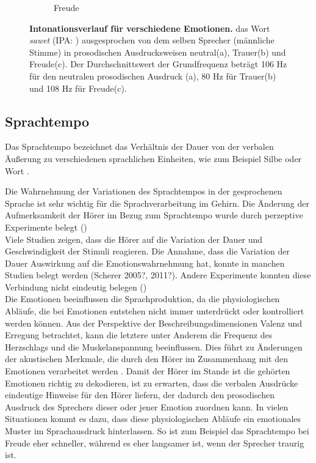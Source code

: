 \documentclass[11pt,a4paper,headsepline,twoside,toc=bibliography]{scrreprt}
\begin{document}
\begin{figure}
\begin{subfigure}{0.8\textwidth}
		\caption{Freude}
		\label{fig:sawet_F}
	\end{subfigure}
	\caption{\textbf{Intonationsverlauf für verschiedene Emotionen.} das Wort \emph{sawet} (IPA: ) ausgesprochen von dem selben Sprecher (männliche Stimme) in prosodischen Ausdrucksweisen  neutral(a), Trauer(b) und Freude(c). Der Durchschnittswert der Grundfrequenz beträgt 106 Hz für den neutralen prosodischen Ausdruck (a), 80 Hz für Trauer(b) und 108 Hz für Freude(c).}
	\label{fig:pitch_variation}
\end{figure}


\subsection{Sprachtempo}

Das Sprachtempo bezeichnet das Verhältnis der Dauer von der verbalen Äußerung zu verschiedenen sprachlichen Einheiten, wie zum Beispiel Silbe oder Wort \autocite{Ackermann2004}.  

Die Wahrnehmung der Variationen des Sprachtempos in der gesprochenen Sprache ist sehr wichtig für die Sprachverarbeitung im Gehirn. Die Änderung der Aufmerksamkeit der Hörer im Bezug zum Sprachtempo wurde durch perzeptive Experimente belegt () \\ 
 

 
Viele Studien zeigen, dass die Hörer auf die Variation der Dauer und Geschwindigkeit der Stimuli reagieren. Die Annahme, dass die Variation der Dauer Auswirkung auf die Emotionswahrnehmung hat, konnte in manchen Studien belegt werden (Scherer 2005?, 2011?). Andere Experimente konnten diese Verbindung nicht eindeutig belegen (\cite{Schirmer2016a})\\

Die Emotionen beeinflussen die Sprachproduktion, da die physiologischen Abläufe, die bei Emotionen entstehen nicht immer unterdrückt oder kontrolliert werden können. Aus der Perspektive der Beschreibungsdimensionen Valenz und Erregung betrachtet, kann die letztere unter Anderem die Frequenz des Herzschlags und die Muskelanspannung beeinflussen. Dies führt zu Änderungen der akustischen Merkmale, die durch den Hörer im Zusammenhang mit den Emotionen verarbeitet werden \parencite{Schirmer2016a}. Damit der Hörer im Stande ist die gehörten Emotionen richtig zu dekodieren, ist zu erwarten, dass die verbalen Ausdrücke eindeutige Hinweise für den Hörer liefern, der dadurch den prosodischen Ausdruck des Sprechers dieser oder jener Emotion zuordnen kann.  In vielen Situationen kommt es dazu, dass diese physiologischen Abläufe ein emotionales Muster im Sprachausdruck hinterlassen. So ist zum Beispiel das Sprachtempo bei Freude eher schneller, während es eher langsamer ist, wenn der Sprecher traurig ist. 
 
\end{document}
